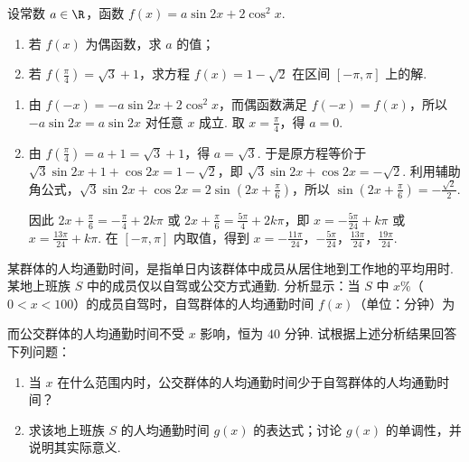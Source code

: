\begin{problem}
设常数 \(a\in\R\)，函数 \(f(x)=a\sin2x+2\cos^2x\).

\begin{enumerate}
\item 若 \(f(x)\) 为偶函数，求 \(a\) 的值；
\item 若 \(f\left(\frac\pi4\right)=\sqrt3+1\)，求方程 \(f(x)=1-\sqrt2\) 在区间 \([-\pi,\pi]\) 上的解.
\end{enumerate}
\end{problem}

\begin{solution}
\begin{enumerate}
\item 由 \(f(-x)=-a\sin2x+2\cos^2x\)，而偶函数满足 \(f(-x)=f(x)\)，所以 \(-a\sin2x=a\sin2x\) 对任意 \(x\) 成立. 取 \(x=\frac\pi4\)，得 \(a=0\).
\item 由 \(f\left(\frac\pi4\right)=a+1=\sqrt3+1\)，得 \(a=\sqrt3\). 于是原方程等价于 \(\sqrt3\sin2x+1+\cos2x=1-\sqrt2\)，即 \(\sqrt3\sin2x+\cos2x=-\sqrt2\). 利用辅助角公式，\(\sqrt3\sin2x+\cos2x=2\sin\left(2x+\frac\pi6\right)\)，所以 \(\sin\left(2x+\frac\pi6\right)=-\frac{\sqrt2}{2}\).

因此 \(2x+\frac\pi6=-\frac\pi4+2k\pi\) 或 \(2x+\frac\pi6=\frac{5\pi}{4}+2k\pi\)，即 \(x=-\frac{5\pi}{24}+k\pi\) 或 \(x=\frac{13\pi}{24}+k\pi\). 在 \([-\pi,\pi]\) 内取值，得到 \(x=-\frac{11\pi}{24}\)，\(-\frac{5\pi}{24}\)，\(\frac{13\pi}{24}\)，\(\frac{19\pi}{24}\).
\end{enumerate}
\end{solution}

\begin{problem}
某群体的人均通勤时间，是指单日内该群体中成员从居住地到工作地的平均用时. 某地上班族 \(S\) 中的成员仅以自驾或公交方式通勤. 分析显示：当 \(S\) 中 \(x\%\)（\(0<x<100\)）的成员自驾时，自驾群体的人均通勤时间 \(f(x)\)（单位：分钟）为


而公交群体的人均通勤时间不受 \(x\) 影响，恒为 \(40\) 分钟. 试根据上述分析结果回答下列问题：

\begin{enumerate}
\item 当 \(x\) 在什么范围内时，公交群体的人均通勤时间少于自驾群体的人均通勤时间？
\item 求该地上班族 \(S\) 的人均通勤时间 \(g(x)\) 的表达式；讨论 \(g(x)\) 的单调性，并说明其实际意义.
\end{enumerate}
\end{problem}

